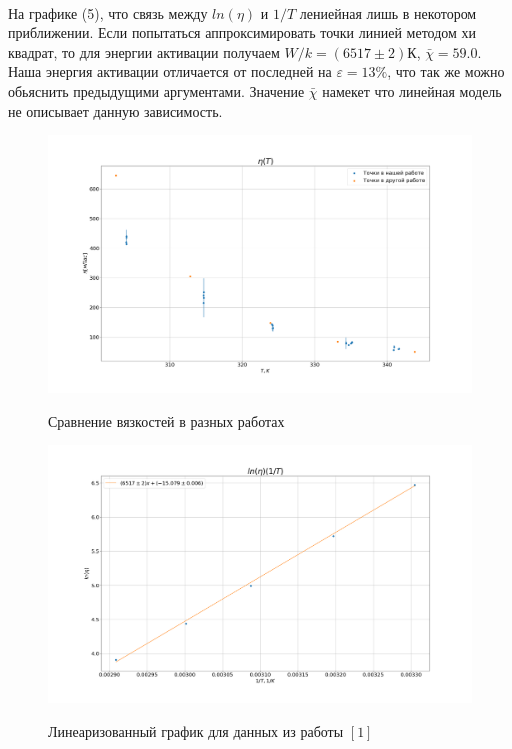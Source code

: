 \documentclass[a4paper, 12pt]{article}
\begin{document}
    \paragraph{}
    На графике (5), что связь между $ln(\eta)$ и $1/T$ лениейная лишь в некотором приближении. Если попытаться аппроксимировать точки линией методом хи квадрат, то для энергии активации получаем $W/k=(6517\pm2)К$, $\bar \chi = 59.0$. Наша энергия активации отличается от последней на $\varepsilon = 13\%$, что так же можно обьяснить предыдущими аргументами. Значение $\bar\chi$ намекет что линейная модель не описывает данную зависимость.

    \begin{figure}
        \includegraphics[width=1.2\textwidth]{eta}
        \label{eta_real1}
        \caption{Сравнение вязкостей в разных работах}
    \end{figure}

    \begin{figure}
        \includegraphics[width=1.2\textwidth]{real}
        \label{eta_real2}
        \caption{Линеаризованный график для данных из работы $[1]$}
    \end{figure}
\end{document}
